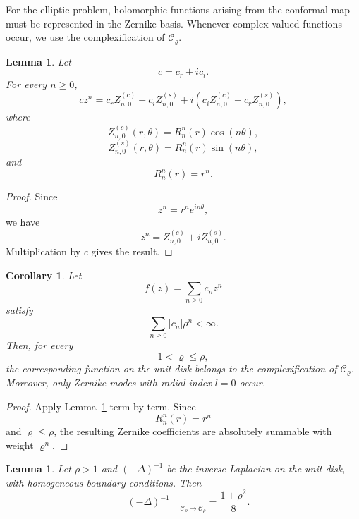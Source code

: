 \documentclass[11pt,a4paper]{amsart}
\newtheorem{lemma}[theorem]{Lemma}
\newtheorem{corollary}[theorem]{Corollary}
\begin{document}
For the elliptic problem, holomorphic functions arising from the
conformal map must be represented in the Zernike basis. Whenever
complex-valued functions occur, we use the complexification of
$\mathcal C_\varrho$.

\begin{lemma}\label{lem:Taylor2Zerni}
	Let
	\[
	c=c_r+ic_i.
	\]
	For every $n\ge0$,
	\[
	c z^n
	=
	c_r Z^{(c)}_{n,0}
	-
	c_i Z^{(s)}_{n,0}
	+
	i
	\left(
	c_i Z^{(c)}_{n,0}
	+
	c_r Z^{(s)}_{n,0}
	\right),
	\]
	where
	\[
	Z^{(c)}_{n,0}(r,\theta)
	=
	R_n^n(r)\cos(n\theta),
	\]
	\[
	Z^{(s)}_{n,0}(r,\theta)
	=
	R_n^n(r)\sin(n\theta),
	\]
	and
	\[
	R_n^n(r)=r^n.
	\]
\end{lemma}

\begin{proof}
	Since
	\[
	z^n=r^ne^{in\theta},
	\]
	we have
	\[
	z^n
	=
	Z^{(c)}_{n,0}
	+
	iZ^{(s)}_{n,0}.
	\]
	Multiplication by $c$ gives the result.
\end{proof}


\begin{corollary}\label{cor:Taylor2Zerni}
	Let
	\[
	f(z)=\sum_{n\ge0}c_nz^n
	\]
	satisfy
	\[
	\sum_{n\ge0}|c_n|\rho^n<\infty.
	\]
	Then, for every
	\[
	1<\varrho\le\rho,
	\]
	the corresponding function on the unit disk belongs to the
	complexification of $\mathcal C_\varrho$. Moreover, only Zernike
	modes with radial index $l=0$ occur.
\end{corollary}

\begin{proof}
	Apply Lemma~\ref{lem:Taylor2Zerni} term by term. Since
	\[
	R_n^n(r)=r^n
	\]
	and $\varrho\le\rho$, the resulting Zernike coefficients are
	absolutely summable with weight $\varrho^n$.
\end{proof}

\begin{lemma}\label{lem:invlapnorm}
	Let $\rho>1$ and $(-\Delta)^{-1}$ be the inverse Laplacian on the unit disk, with homogeneous boundary conditions. Then
	\[
	\left\|(-\Delta)^{-1}\right\|_{\mathcal C_\rho\to\mathcal C_\rho}
	=
	\frac{1+\rho^2}{8}.
	\]
\end{lemma}
\end{document}
